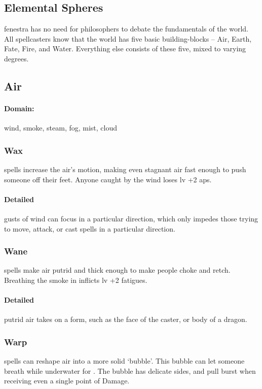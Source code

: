 \begin{multicols}{2}

\subsection{Elemental Spheres}

\Gls{fenestra} has no need for philosophers to debate the fundamentals of the world.
All spellcasters know that the world has five basic building-blocks -- Air, Earth, Fate, Fire, and Water.
Everything else consists of these five, mixed to varying degrees.

\subsection{Air}
\paragraph{Domain:}
wind, smoke, steam, fog, mist, cloud

\subsubsection{Wax}
spells increase the air's motion, making even stagnant air fast enough to push someone off their feet.
Anyone caught by the wind loses \gls{lv} +2 \glspl{ap}.

\paragraph{Detailed}
gusts of wind can focus in a particular direction, which only impedes those trying to move, attack, or cast spells in a particular direction.

\subsubsection{Wane}
spells make air putrid and thick enough to make people choke and retch.
Breathing the smoke in inflicts \gls{lv} +2 \glspl{fatigue}.

\paragraph{Detailed}
putrid air takes on a form, such as the face of the caster, or body of a dragon.

\subsubsection{Warp}
spells can reshape air into a more solid `bubble'.
This bubble can let someone breath while underwater for .
The bubble has delicate sides, and pull burst when receiving even a single point of Damage.


\end{multicols}
